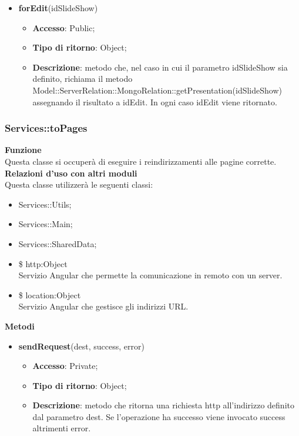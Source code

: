 {\begin{itemize}
\begin{itemize}
			\end{itemize}
			\item \textbf{forEdit}(idSlideShow)
			\begin{itemize}
				\item \textbf{Accesso}: Public;
				\item \textbf{Tipo di ritorno}: Object;
				\item \textbf{Descrizione}: metodo che, nel caso in cui il parametro idSlideShow sia definito, richiama il metodo Model::\-ServerRelation::\-MongoRelation::\-getPresentation(idSlideShow) assegnando il risultato a idEdit. In ogni caso idEdit viene ritornato.
			\end{itemize}
		\end{itemize}
}
\subsubsection{Services::toPages}{
		\label{sub:servicestoPages}
		\textbf{Funzione}\\
		\indent Questa classe si occuperà di eseguire i reindirizzamenti alle pagine corrette.\\
		\textbf{Relazioni d'uso con altri moduli}\\
		\indent Questa classe utilizzerà le seguenti classi:
		\begin{itemize}
			\item Services::Utils;
			\item Services::Main;
			\item Services::SharedData;
			\item \$ http:Object\\
				\indent Servizio Angular che permette la comunicazione in remoto con un server.
			\item \$ location:Object\\
				\indent Servizio Angular che gestisce gli indirizzi URL.
		\end{itemize}
		\textbf{Metodi}
		\begin{itemize}
			\item \textbf{sendRequest}(dest, success, error)
			\begin{itemize}
				\item \textbf{Accesso}: Private;
				\item \textbf{Tipo di ritorno}: Object;
				\item \textbf{Descrizione}: metodo che ritorna una richiesta http all'indirizzo definito dal parametro dest. Se l'operazione ha successo viene invocato success altrimenti error.

\end{itemize}
\end{itemize}}
